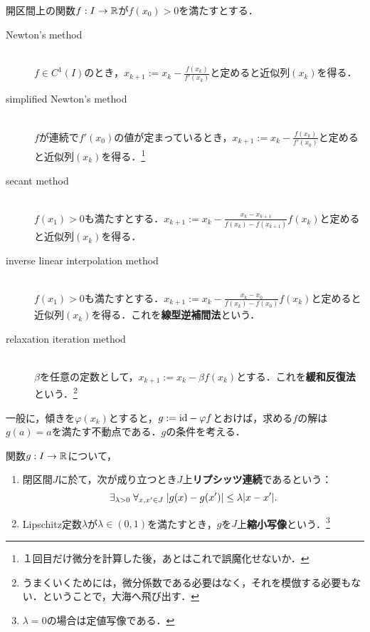 \documentclass[uplatex, dvipdfmx]{jsreport}
\begin{document}
\begin{definition}
    開区間上の関数$f:I\to\mathbb{R}$が$f(x_0)>0$を満たすとする．
    \begin{description}
        \item[Newton's method] \mbox{}\\$f\in C^1(I)$のとき，$x_{k+1}:=x_k-\frac{f(x_k)}{f'(x_k)}$と定めると近似列$(x_k)$を得る．
        \item[simplified Newton's method] \mbox{}\\$f$が連続で$f'(x_0)$の値が定まっているとき，$x_{k+1}:=x_k-\frac{f(x_k)}{f'(x_0)}$と定めると近似列$(x_k)$を得る．\footnote{１回目だけ微分を計算した後，あとはこれで誤魔化せないか．}
        \item[secant method] \mbox{}\\$f(x_1)>0$も満たすとする．$x_{k+1}:=x_k-\frac{x_k-x_{k+1}}{f(x_k)-f(x_{k+1})}f(x_k)$と定めると近似列$(x_k)$を得る．
        \item[inverse linear interpolation method] \mbox{}\\$f(x_1)>0$も満たすとする．$x_{k+1}:=x_k-\frac{x_k-x_{0}}{f(x_k)-f(x_{0})}f(x_k)$と定めると近似列$(x_k)$を得る．これを\textbf{線型逆補間法}という．
        \item[relaxation iteration method] \mbox{}\\$\beta$を任意の定数として，$x_{k+1}:=x_k-\beta f(x_k)$とする．これを\textbf{緩和反復法}という．\footnote{うまくいくためには，微分係数である必要はなく，それを模倣する必要もない．ということで，大海へ飛び出す．}
    \end{description}
    一般に，傾きを$\varphi(x_k)$とすると，$g:=\mathrm{id}-\varphi f$とおけば，求める$f$の解は$g(a)=a$を満たす不動点である．$g$の条件を考える．
\end{definition}

\begin{definition}
    関数$g:I\to\mathbb{R}$について，
    \begin{enumerate}
        \item 閉区間$J$に於て，次が成り立つとき$J$上\textbf{リプシッツ連続}であるという：
        \[\exists_{\lambda>0}\;\forall_{x,x'\in J}\;\lvert g(x)-g(x')\rvert\le\lambda\lvert x-x'\rvert.\]
        \item Lipschitz定数$\lambda$が$\lambda\in(0,1)$を満たすとき，$g$を$J$上\textbf{縮小写像}という．\footnote{$\lambda=0$の場合は定値写像である．}
    \end{enumerate}
\end{definition}
\end{document}
